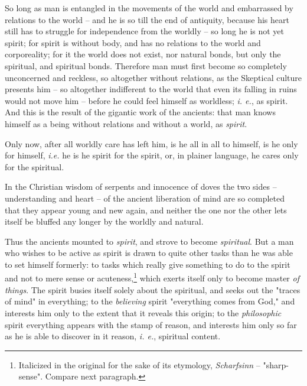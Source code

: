 \documentclass[a4paper]{book}
\begin{document}
So long as man is entangled in the movements of the world and embarrassed by 
relations to the world -- and he is so till the end of antiquity, because his 
heart still has to struggle for independence from the worldly -- so long he is 
not yet spirit; for spirit is without body, and has no relations to the world 
and corporeality; for it the world does not exist, nor natural bonds, but only 
the spiritual, and spiritual bonds. Therefore man must first become so 
completely unconcerned and reckless, so altogether without relations, as the 
Skeptical culture presents him -- so altogether indifferent to the world that 
even its falling in ruins would not move him -- before he could feel himself 
as worldless; \textit{i. e.}, as spirit. And this is the result of the 
gigantic work of the ancients: that man knows himself as a being without 
relations and without a world, as \textit{spirit}.

Only now, after all worldly care has left him, is he all in all to himself, is 
he only for himself, \textit{i.e.} he is he spirit for the spirit, or, in 
plainer language, he cares only for the spiritual.

In the Christian wisdom of serpents and innocence of doves the two sides -- 
understanding and heart -- of the ancient liberation of mind are so completed 
that they appear young and new again, and neither the one nor the other lets 
itself be bluffed any longer by the worldly and natural.

Thus the ancients mounted to \textit{spirit}, and strove to become 
\textit{spiritual}. But a man who wishes to be active as spirit is drawn to 
quite other tasks than he was able to set himself formerly: to tasks which 
really give something to do to the spirit and not to mere sense or 
acuteness,\footnote{Italicized in the original for the sake of its etymology, 
\textit{Scharfsinn} -- "{}sharp-sense"{}. Compare next paragraph.} which 
exerts itself only to become master \textit{of things}. The spirit busies 
itself solely about the spiritual, and seeks out the "{}traces of mind"{} in 
everything; to the \textit{believing} spirit "{}everything comes from God,"{} 
and interests him only to the extent that it reveals this origin; to the 
\textit{philosophic} spirit everything appears with the stamp of reason, and 
interests him only so far as he is able to discover in it reason, \textit{i. 
e.}, spiritual content.
\end{document}
